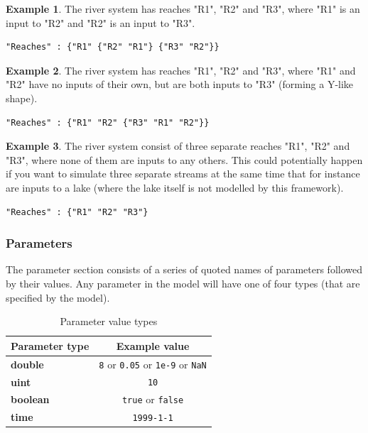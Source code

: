\documentclass[11pt]{article}
\theoremstyle{definition}
\newtheorem{myexample}{Example}
\newenvironment{example}%
  {\begin{lrbox}{\examplebox}%
   \begin{minipage}{\dimexpr\linewidth-2\fboxsep}
   \begin{myexample}}%
  {\end{myexample}%
   \end{minipage}%
   \end{lrbox}%
   \begin{trivlist}
     \item[]\colorbox{silver}{\usebox\examplebox}
   \end{trivlist}}
\begin{document}
\begin{example}
The river system has reaches "R1", "R2" and "R3", where "R1" is an input to "R2" and "R2" is an input to "R3".
\begin{lstlisting}
"Reaches" : {"R1" {"R2" "R1"} {"R3" "R2"}}
\end{lstlisting} 
\end{example}

\begin{example}
The river system has reaches "R1", "R2" and "R3", where "R1" and "R2" have no inputs of their own, but are both inputs to "R3" (forming a Y-like shape).
\begin{lstlisting}
"Reaches" : {"R1" "R2" {"R3" "R1" "R2"}}
\end{lstlisting} 
\end{example}

\begin{example}
The river system consist of three separate reaches "R1", "R2" and "R3", where none of them are inputs to any others. This could potentially happen if you want to simulate three separate streams at the same time that for instance are inputs to a lake (where the lake itself is not modelled by this framework).
\begin{lstlisting}
"Reaches" : {"R1" "R2" "R3"}
\end{lstlisting} 
\end{example}

\subsubsection{Parameters}

The parameter section consists of a series of quoted names of parameters followed by their values. Any parameter in the model will have one of four types (that are specified by the model). 

\begin{table}[H]
\centering
\label{tab:parametervalues}
\begin{tabular}{|l|c|}
\hline
{\bf Parameter type} & {\bf Example value} \\
\hline
{\bf double} & {\tt 8} or {\tt 0.05} or {\tt 1e-9} or {\tt NaN}  \\
\hline
{\bf uint} & {\tt 10} \\
\hline
{\bf boolean} &{\tt  true} or {\tt false} \\
\hline
{\bf time} & {\tt 1999-1-1} \\
\hline
\end{tabular}
\caption{Parameter value types}
\end{table}
\end{document}
